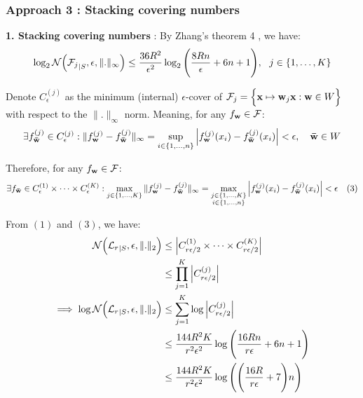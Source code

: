 \subsubsection{Approach 3 : Stacking covering numbers}
\textbf{1. Stacking covering numbers} : By Zhang's theorem 4 \cite{article:tong_zhang}, we have:
\begin{align*}
    \log_2\mathcal{N}\Big( {\mathcal{F}_j}_{|S}, \epsilon, \|.\|_\infty \Big) \le \frac{36R^2}{\epsilon^2}\log_2\Bigg( 
        \frac{8Rn}{\epsilon} + 6n + 1
     \Bigg), \ \ j \in \{ 1, \dots, K \}
\end{align*}

\noindent Denote $C^{(j)}_\epsilon$ as the minimum (internal) $\epsilon$-cover of $\mathcal{F}_j=\Big\{ {\bf x} \mapsto {\bf w}_j {\bf x}: {\bf w}\in W \Big\}$ with respect to the $\|.\|_\infty$ norm. Meaning, for any $f_{\bf w} \in \mathcal{F}$:
\begin{align*}
    \exists f_{\bf \bar w}^{(j)} \in C^{(j)}_\epsilon : \|f_{\bf w}^{(j)} - f_{\bf \bar w}^{(j)} \|_\infty = \sup_{i \in \{1, \dots, n \}}\Big| f_{\bf w}^{(j)}(x_i) - f_{\bf \bar w}^{(j)}(x_i) \Big| < \epsilon, \ \ \ {\bf \bar w}\in W
\end{align*}

\noindent Therefore, for any $f_{\bf w}\in \mathcal{F}$:
\begin{align*}
    \exists f_{\bf \bar w} \in C^{(1)}_\epsilon \times \dots \times C^{(K)}_\epsilon : \max_{j\in \{1, \dots, K \}} \|f_{\bf w}^{(j)} - f_{\bf \bar w}^{(j)}\|_\infty = \max_{
        \substack{ j \in \{1, \dots, K \}\\ i \in \{1, \dots, n\}}
    }\Big| 
        f_{\bf w}^{(j)}(x_i) - f_{\bf \bar w}^{(j)}(x_i) 
     \Big| < \epsilon \ \ \ (3)
\end{align*}

\noindent From $(1)$ and $(3)$, we have:
\begin{align*}
    \mathcal{N}\Big( {\mathcal{L}_r}_{|S}, \epsilon, \|.\|_2 \Big) &\le \Big| 
        C^{(1)}_{r\epsilon/2} \times \dots \times C^{(K)}_{r\epsilon/2}
     \Big| \\
        &\le \prod_{j=1}^K \Big| C^{(j)}_{r\epsilon/2} \Big| \\
    \implies
    \log \mathcal{N}\Big( {\mathcal{L}_r}_{|S}, \epsilon, \|.\|_2 \Big) 
        &\le \sum_{j=1}^K \log \Big| C^{(j)}_{r\epsilon/2} \Big| \\
        &\le \frac{144R^2K}{r^2\epsilon^2} \log\Bigg( 
            \frac{16Rn}{r\epsilon} + 6n + 1
         \Bigg) \\
        &\le \frac{144R^2K}{r^2\epsilon^2} \log\Bigg( 
            \Bigg( \frac{16R}{r\epsilon} + 7 \Bigg)n
         \Bigg)
\end{align*}


